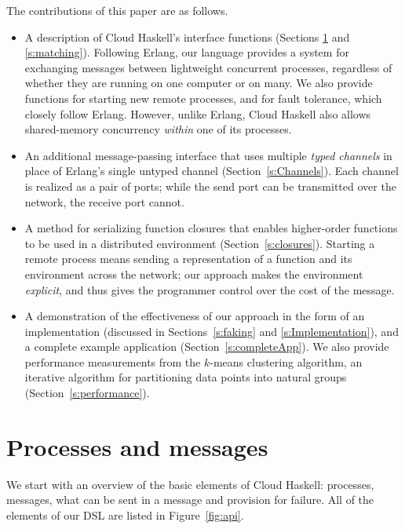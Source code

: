 \documentclass{sigplanconf}
\begin{document}
The contributions of this paper are as follows.

\begin{itemize}
\item A description of Cloud Haskell's interface functions (Sections \ref{s:ProcessesAndMessages} and \ref{s:matching}). Following Erlang, our language provides a system for exchanging messages between lightweight concurrent processes, regardless of whether they are running on one computer or on many. We also provide functions for starting new remote processes, and for fault tolerance, which closely follow Erlang. 
However, unlike Erlang, Cloud Haskell also allows shared-memory concurrency \emph{within} one of its processes.

\item An additional message-passing interface that uses multiple \emph{typed channels} in place of Erlang's single untyped channel (Section~\ref{s:Channels}).  Each channel is realized as a pair of ports; while the send port can be transmitted over the network, the receive port cannot. 

\item A method for serializing function closures that enables higher-order functions to be used in a distributed environment (Section~\ref{s:closures}). Starting a remote process means sending a representation of a function and its environment across the network;  our approach makes the environment \emph{explicit}, and thus gives the programmer control over the cost of the message.

\item A demonstration of the effectiveness of our approach in the form of an implementation (discussed in Sections~\ref{s:faking} and \ref{s:Implementation}), and a complete example application (Section~\ref{s:completeApp}).
We also provide performance measurements from the $k$-means clustering algorithm, an iterative algorithm for partitioning data points into natural groups (Section~\ref{s:performance}). 
\end{itemize}


\section{Processes and messages}
\label{s:ProcessesAndMessages}

We start with an overview of the basic elements of Cloud Haskell:
processes, messages, what can be sent in a message and provision for failure.
All of the elements of our DSL are listed in Figure~\ref{fig:api}.
\end{document}
